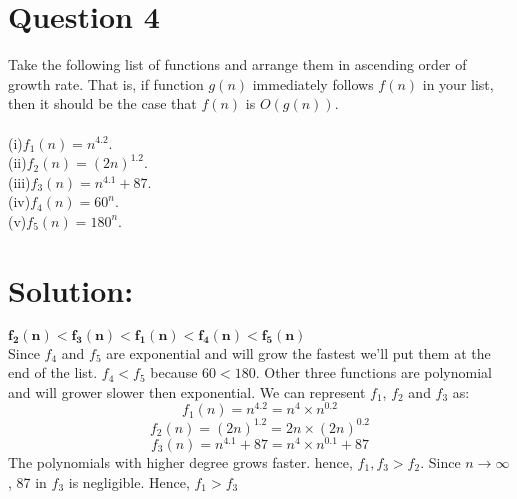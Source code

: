 \documentclass[12pt, letterpaper]{article}
\begin{document}
\section*{Question 4}
Take the following list of functions and arrange them in ascending order of growth rate.  That is, if function $g(n)$ immediately follows $f(n)$ in your list, then it should be the case that $f(n)$ is $O(g(n))$.\\
\\(i)$f_1(n) =n^{4.2}$.
\\(ii)$f_2(n) = (2n)^{1.2}$.
\\(iii)$f_3(n) =n^{4.1}+ 87$.
\\(iv)$f_4(n) = 60^{n}$.
\\(v)$f_5(n) = 180^{n}$.
\section*{Solution:}
$\bm{f_2(n) < f_3(n) < f_1(n) < f_4(n) < f_5(n)}$
\\Since $f_4$ and $f_5$ are exponential and will grow the fastest we'll put them at the end of the list. $f_4 < f_5$ because $60 < 180$. Other three functions are polynomial and will grower slower then exponential. We can represent $f_1$, $f_2$ and $f_3$ as: $$ f_1(n) =n^{4.2} = n^{4} \times n^{0.2} $$ $$ f_2(n) =(2n)^{1.2} = 2n \times (2n)^{0.2} $$
 $$ f_3(n) =n^{4.1} + 87 = n^{4} \times n^{0.1} + 87$$ The polynomials with higher degree grows faster. hence, $f_1, f_3 > f_2$. Since $n \to \infty$, 87 in $f_3$ is negligible. Hence, $f_1 > f_3$
\end{document}
